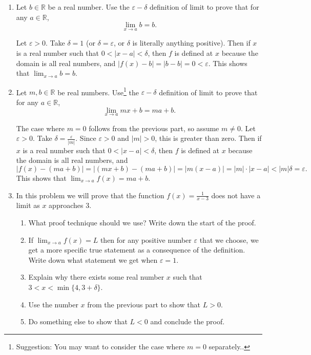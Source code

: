 \documentclass[12pt]{amsart}
\def\de{\delta}
\def\e{\varepsilon}
\newcommand{\R}{{\mathbb{R}}}
\numberwithin{equation}{section}
\theoremstyle{plain} %
\theoremstyle{definition}
\theoremstyle{remark}
\begin{document}
\begin{enumerate}
\item Let $b\in \R$ be a real number. Use the $\e-\de$ definition of limit to prove that for any $a\in \R$, 
\[\displaystyle \lim_{x\to a} b = b.\]

\begin{framed}
Let $\e>0$. Take $\delta=1$ (or $\delta=\e$, or $\delta$ is literally anything positive). Then if $x$ is a real number such that $0<|x-a|<\delta$, then $f$ is defined at $x$ because the domain is all real numbers, and $|f(x)-b| = |b-b| = 0 <\e$. This shows that $\displaystyle \lim_{x\to a} b = b$.
\end{framed}


\item Let $m,b\in \R$ be real numbers. Use\footnote{Suggestion: You may want to consider the case where $m=0$ separately..} the $\e-\de$ definition of limit to prove that for any $a\in \R$, 
\[\displaystyle \lim_{x\to a} mx+ b = ma + b.\]

\begin{framed}
The case where $m=0$ follows from the previous part, so assume $m\neq 0$. Let $\e>0$. Take $\delta=\frac{\e}{|m|}$. Since $\e>0$ and $|m|>0$, this is greater than zero. Then if $x$ is a real number such that $0<|x-a|<\delta$, then $f$ is defined at $x$ because the domain is all real numbers, and 
\[ |f(x)-(ma+b)| = |(mx+b)-(ma+b)| = |m(x-a)| = |m| \cdot |x-a| < |m| \delta = \e.\] This shows that $\displaystyle \lim_{x\to a} f(x) = ma+b$.
\end{framed}

\item In this problem we will prove that the function $f(x) = \displaystyle \frac{1}{x-3}$ does not have a limit as $x$ approaches $3$.
\begin{enumerate}
\item What proof technique should we use? Write down the start of the proof.
\item If $\lim_{x\to a} f(x)=L$ then for any positive number $\e$ that we choose, we get a more specific true statement as a consequence of the definition. Write down what statement we get when $\e=1$.
\item Explain why there exists some real number $x$ such that ${3<x<\min\{4,3+\delta\}}$.
\item Use the number $x$ from the previous part to show that $L>0$.
\item Do something else to show that $L<0$ and conclude the proof.
\end{enumerate}


\end{enumerate}
\end{document}
